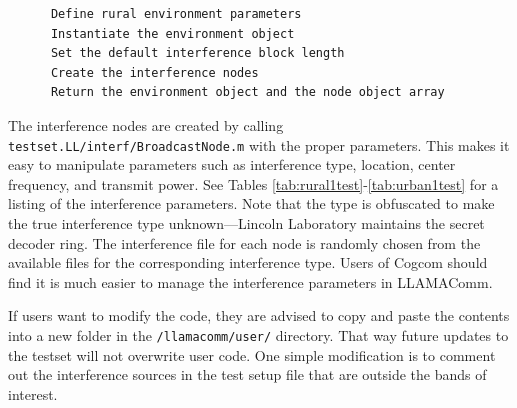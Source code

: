 \begin{verbatim}
      Define rural environment parameters
      Instantiate the environment object
      Set the default interference block length
      Create the interference nodes
      Return the environment object and the node object array
\end{verbatim}

The interference nodes are created by calling
\verb+testset.LL/interf/BroadcastNode.m+ with the proper parameters.
This makes it easy to manipulate parameters such as interference
type, location, center frequency, and transmit power. See Tables
\ref{tab:rural1test}-\ref{tab:urban1test} for a listing of the
interference parameters.  Note that the type is obfuscated to make
the true interference type unknown---Lincoln Laboratory maintains
the secret decoder ring.  The interference file for each node is
randomly chosen from the available files for the corresponding
interference type.  Users of Cogcom should find it is much easier to
manage the interference parameters in LLAMAComm.

If users want to modify the code, they are advised to copy and paste the
contents into a new folder in the \verb+/llamacomm/user/+ directory.  That way
future updates to the testset will not overwrite user code.  One simple
modification is to comment out the interference sources in the test setup file
that are outside the bands of interest.

